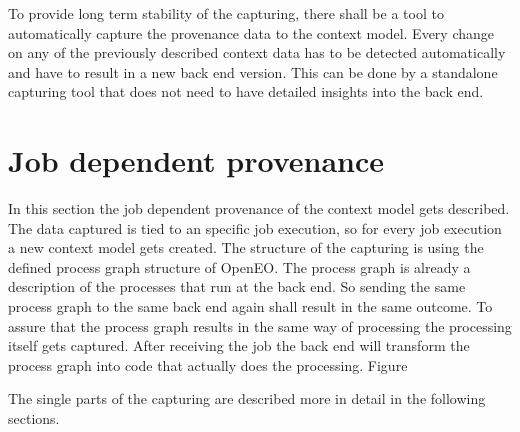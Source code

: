 \documentclass[draft,final]{vutinfth} %
\begin{document}
\begin{enumerate}
	To  provide long term stability of the capturing, there shall be a tool to automatically capture the provenance data to the context model. Every change on any of the previously described context data has to be detected automatically and have to result in a new back end version. This can be done by a standalone capturing tool that does not need to have detailed insights into the back end. 
	
\end{enumerate}
\section{Job dependent provenance}
In this section the job dependent provenance of the context model gets described. The data captured is tied to an specific job execution, so for every job execution a new context model gets created. The structure of the capturing is using the defined process graph structure of OpenEO. The process graph is already a description of the processes that run at the back end. So sending the same process graph to the same back end again shall result in the same outcome. To assure that the process graph results in the same way of processing the processing itself gets captured. After receiving the job the back end will transform the process graph into code that actually does the processing. Figure %


The single parts of the capturing are described more in detail in the following sections. 
\end{document}
